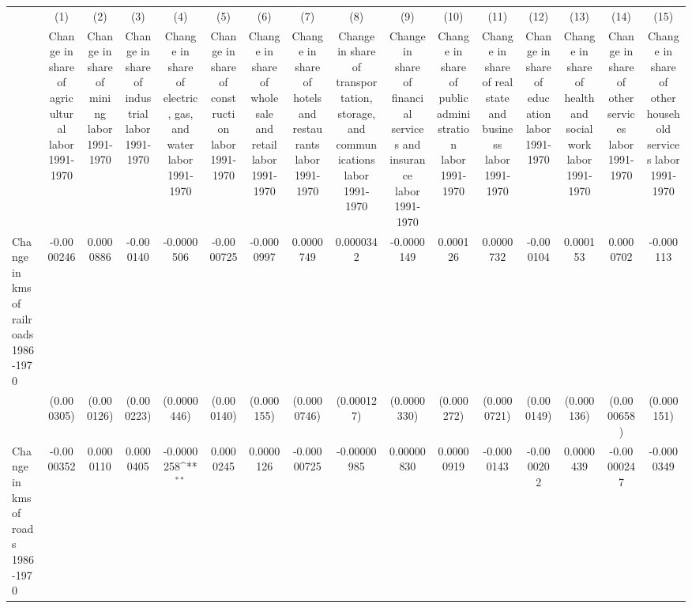 {
\def\sym#1{\ifmmode^{#1}\else\(^{#1}\)\fi}
\begin{tabular}{l*{15}{c}}
\hline\hline
                &\multicolumn{1}{c}{(1)}&\multicolumn{1}{c}{(2)}&\multicolumn{1}{c}{(3)}&\multicolumn{1}{c}{(4)}&\multicolumn{1}{c}{(5)}&\multicolumn{1}{c}{(6)}&\multicolumn{1}{c}{(7)}&\multicolumn{1}{c}{(8)}&\multicolumn{1}{c}{(9)}&\multicolumn{1}{c}{(10)}&\multicolumn{1}{c}{(11)}&\multicolumn{1}{c}{(12)}&\multicolumn{1}{c}{(13)}&\multicolumn{1}{c}{(14)}&\multicolumn{1}{c}{(15)}\\
                &\multicolumn{1}{c}{Change in share of agricultural labor 1991-1970}&\multicolumn{1}{c}{Change in share of mining labor 1991-1970}&\multicolumn{1}{c}{Change in share of industrial labor 1991-1970}&\multicolumn{1}{c}{Change in share of electric, gas, and water labor 1991-1970}&\multicolumn{1}{c}{Change in share of construction labor 1991-1970}&\multicolumn{1}{c}{Change in share of wholesale and retail labor 1991-1970}&\multicolumn{1}{c}{Change in share of hotels and restaurants labor 1991-1970}&\multicolumn{1}{c}{Change in share of transportation, storage, and communications labor 1991-1970}&\multicolumn{1}{c}{Change in share of financial services and insurance labor 1991-1970}&\multicolumn{1}{c}{Change in share of public administration labor 1991-1970}&\multicolumn{1}{c}{Change in share of real state and business labor 1991-1970}&\multicolumn{1}{c}{Change in share of education labor 1991-1970}&\multicolumn{1}{c}{Change in share of health and social work labor 1991-1970}&\multicolumn{1}{c}{Change in share of other services labor 1991-1970}&\multicolumn{1}{c}{Change in share of other household services labor 1991-1970}\\
\hline
Change in kms of railroads 1986-1970&-0.0000246         &0.0000886         &-0.000140         &-0.0000506         &-0.0000725         &-0.0000997         &0.0000749         &0.0000342         &-0.0000149         & 0.000126         &0.0000732         &-0.000104         & 0.000153         &0.0000702         &-0.000113         \\
                &(0.000305)         &(0.000126)         &(0.000223)         &(0.0000446)         &(0.000140)         &(0.000155)         &(0.0000746)         &(0.000127)         &(0.0000330)         &(0.000272)         &(0.0000721)         &(0.000149)         &(0.000136)         &(0.0000658)         &(0.000151)         \\
[1em]
Change in kms of roads 1986-1970&-0.0000352         &0.0000110         &0.0000405         &-0.0000258\sym{**} &0.0000245         &0.0000126         &-0.00000725         &-0.00000985         &0.00000830         &0.00000919         &-0.0000143         &-0.0000202         &0.0000439         &-0.00000247         &-0.0000349         \\

\end{tabular}}
